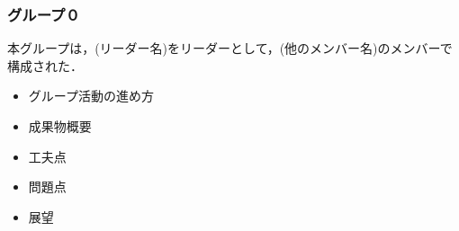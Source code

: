 \subsubsection{グループ０}
    
    本グループは，(リーダー名)をリーダーとして，(他のメンバー名)のメンバーで構成された．

    \begin{itemize}
        \item グループ活動の進め方
        


        \item 成果物概要
        


        \item 工夫点
        


        \item 問題点
        


        \item 展望
        


    \end{itemize}

